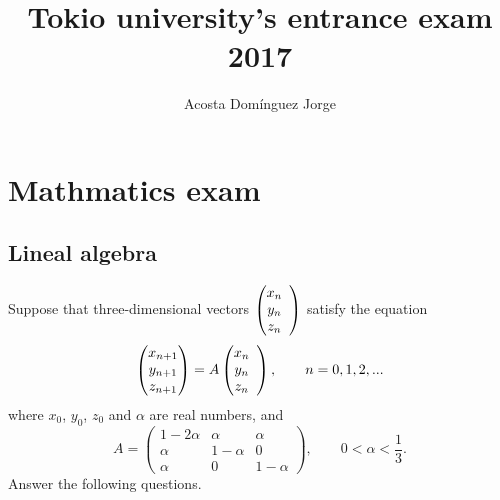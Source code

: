 \documentclass[letterpaper]{article}
\title{\textbf{Tokio university's entrance exam 2017}}
\author{Acosta Domínguez Jorge}
\date{}
\newcommand{\itab}[0]{\hspace{2em}}
\begin{document}
\maketitle
\newpage
{}

\section{Mathmatics exam}
\subsection{Lineal algebra}

Suppose that three-dimensional vectors $\left(
\begin{matrix}
x_n\\y_n\\z_n\\
\end{matrix}\\
\right)$
satisfy the equation
\begin{equation*}
\left(
\begin{matrix}
x_{n+1}\\y_{n+1}\\z_{n+1}
\end{matrix}
\right)
=A\left(
\begin{matrix}
x_n\\y_n\\z_n\\
\end{matrix}\\
\right),\itab n = 0, 1, 2, ...
\end{equation*}
where $x_0$, $y_0$, $z_0$ and $\alpha$ are real numbers, and
\begin{equation*}
A = \left(\begin{matrix}
1-2\alpha & \alpha & \alpha\\
\alpha & 1-\alpha & 0\\
\alpha & 0 & 1-\alpha
\end{matrix}\right),\itab0<\alpha<\frac{1}{3}.
\end{equation*}
Answer the following questions.
\end{document}
